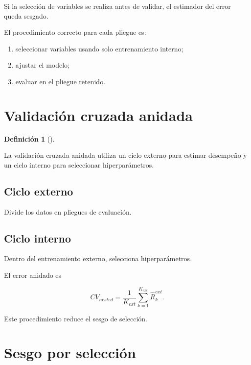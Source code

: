 \documentclass[
  spanish,
  11pt,
  letterpaper,
  DIV=11,
  numbers=noendperiod]{scrreprt}
\providecommand{\tightlist}{%
  \setlength{\itemsep}{0pt}\setlength{\parskip}{0pt}}
\theoremstyle{definition}
\newtheorem{definition}{Definición}[chapter]
\theoremstyle{plain}
\theoremstyle{definition}
\theoremstyle{remark}
\begin{document}
Si la selección de variables se realiza antes de validar, el estimador
del error queda sesgado.

El procedimiento correcto para cada pliegue es:

\begin{enumerate}
\def\labelenumi{\arabic{enumi}.}
\tightlist
\item
  seleccionar variables usando solo entrenamiento interno;
\item
  ajustar el modelo;
\item
  evaluar en el pliegue retenido.
\end{enumerate}

\section{Validación cruzada
anidada}\label{validaciuxf3n-cruzada-anidada}

\begin{definition}[]\protect\hypertarget{def-validacion-anidada}{}\label{def-validacion-anidada}

La validación cruzada anidada utiliza un ciclo externo para estimar
desempeño y un ciclo interno para seleccionar hiperparámetros.

\end{definition}

\subsection{Ciclo externo}\label{ciclo-externo}

Divide los datos en pliegues de evaluación.

\subsection{Ciclo interno}\label{ciclo-interno}

Dentro del entrenamiento externo, selecciona hiperparámetros.

El error anidado es

\[
CV_{nested}
=
\frac{1}{K_{ext}}
\sum_{k=1}^{K_{ext}}
\widehat{R}^{ext}_k.
\]

Este procedimiento reduce el sesgo de selección.

\section{Sesgo por selección}\label{sesgo-por-selecciuxf3n}
\end{document}
